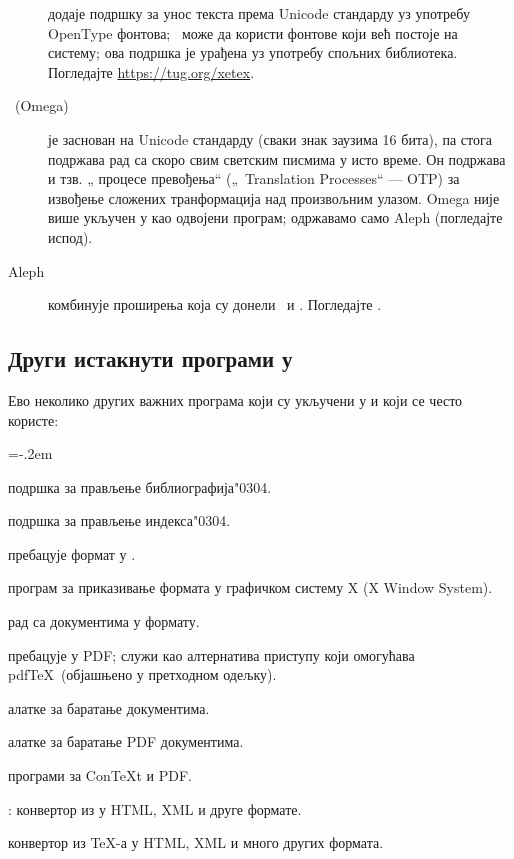 \documentclass{article}
\begin{document}
\begin{description}
\item [\XeTeX] додаје подршку за унос текста према Unicode
  стандарду уз употребу OpenType фонтова; \XeTeX\ може да користи
  фонтове који већ постоје на систему; ова подршка је урађена уз
  употребу спољних библиотека. Погледајте \url{https://tug.org/xetex}.

\item [\OMEGA\ (Omega)] је заснован на Unicode стандарду (сваки знак
  заузима 16 бита), па стога подржава рад са скоро свим светским
  писмима у исто време. Он подржава и тзв. „\OMEGA{} процесе превођења“
  („\textenglish{\OMEGA{}~Translation Processes}“ --- OTP) за
  извођење сложених транформација над произвољним улазом. Omega није
  више укључен у \TL{} као одвојени програм; одржавамо само Aleph
  (погледајте испод).

\item [Aleph] комбинује проширења која су донели \OMEGA\ и \eTeX.
  Погледајте .

\end{description}


\subsection{Други истакнути програми у \protect\TL}

Ево неколико других важних програма који су укључени у \TL{} и који
се често користе:

\begin{cmddescription}
\itemsep=-.2em
\item [bibtex, biber] подршка за прављење библиографија\char"0304.
\item [makeindex, xindy] подршка за прављење индекса\char"0304.
\item [dvips] пребацује \dvi{} формат у \PS{}.
\item [xdvi] програм за приказивање \dvi{} формата у графичком
  систему X (X Window System).
\item [dviconcat, dviselect] рад са документима у \dvi{} формату.
\item [dvipdfmx] пребацује \dvi{} у PDF; служи као
  алтернатива приступу који омогућава pdf\TeX\ (објашњено у претходном одељку).
\item [psselect, psnup\ldots{}] алатке за баратање \PS{} документима.
\item [pdfjam, pdfjoin\ldots{}] алатке за баратање PDF документима.
\item [context, mtxrun] програми за Con\TeX{}t и PDF.
\item [htlatex, \ldots] : конвертор из \AllTeX{} у
  HTML, XML и друге формате.

конвертор из \TeX{}-а у HTML, XML и
  много других формата.
\end{cmddescription}
\end{document}
